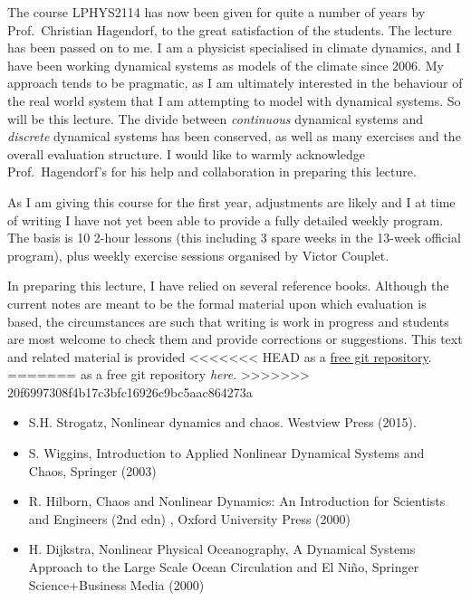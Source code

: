 The course LPHYS2114 has now been given for quite a number of years by
Prof.~Christian Hagendorf, to the great satisfaction of the students.
The lecture has been passed on to me. I am a physicist specialised in
climate dynamics, and I have been working dynamical systems as models of
the climate since 2006. My approach tends to be pragmatic, as I am
ultimately interested in the behaviour of the real world system that I
am attempting to model with dynamical systems. So will be this lecture.
The divide between \emph{continuous} dynamical systems and
\emph{discrete} dynamical systems has been conserved, as well as many
exercises and the overall evaluation structure. I would like to warmly
acknowledge Prof.~Hagendorf's for his help and collaboration in
preparing this lecture.

As I am giving this course for the first year, adjustments are likely
and I at time of writing I have not yet been able to provide a fully
detailed weekly program. The basis is 10 2-hour lessons (this including
3 spare weeks in the 13-week official program), plus weekly exercise
sessions organised by Victor Couplet.

In preparing this lecture, I have relied on several reference books.
Although the current notes are meant to be the formal material upon
which evaluation is based, the circumstances are such that writing is
work in progress and students are most welcome to check them and provide
corrections or suggestions. This text and related material is provided
<<<<<<< HEAD
as a \href{https://github.com/mcrucifix/LPHYS2114}{free git repository}.
=======
as a free git repository \emph{here}.
>>>>>>> 20f6997308f4b17c3bfc16926c9bc5aac864273a

\begin{itemize}
\tightlist
\item
  S.H. Strogatz, Nonlinear dynamics and chaos. Westview Press (2015).
\item
  S. Wiggins, Introduction to Applied Nonlinear Dynamical Systems and
  Chaos, Springer (2003)
\item
  R. Hilborn, Chaos and Nonlinear Dynamics: An Introduction for
  Scientists and Engineers (2nd edn) , Oxford University Press (2000)
\item
  H. Dijkstra, Nonlinear Physical Oceanography, A Dynamical Systems
  Approach to the Large Scale Ocean Circulation and El Niño, Springer
  Science+Business Media (2000)
\end{itemize}
